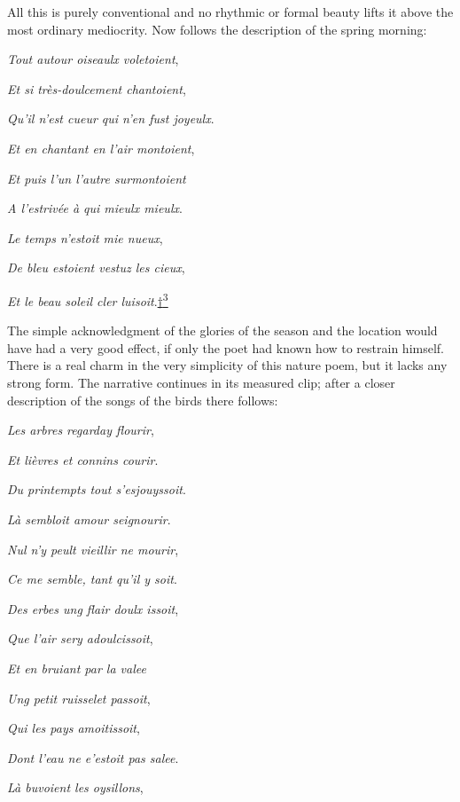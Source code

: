 All this is purely conventional and no rhythmic or formal beauty lifts
it above the most ordinary mediocrity. Now follows the description of
the spring morning:

\emph{Tout autour oiseaulx voletoient},

\emph{Et si très-doulcement chantoient},

\emph{Qu'il n'est cueur qui n'en fust joyeulx}.

\emph{Et en chantant en l'air montoient},

\emph{Et puis l'un l'autre surmontoient}

\emph{A l'estrivée à qui mieulx mieulx}.

\emph{Le temps n'estoit mie nueux},

\emph{De bleu estoient vestuz les cieux},

\emph{Et le beau soleil cler
luisoit}.\protect\hypertarget{21_Chapter_Thirteen__IMAGE_AND_WORD.xhtmlux5cux23id_2709}{\protect\hyperlink{23_NOTES.xhtmlux5cux23id_2710}{†\textsuperscript{3}}}

\protect\hypertarget{21_Chapter_Thirteen__IMAGE_AND_WORD.xhtmlux5cux23page_340}{}{}The
simple acknowledgment of the glories of the season and the location
would have had a very good effect, if only the poet had known how to
restrain himself. There is a real charm in the very simplicity of this
nature poem, but it lacks any strong form. The narrative continues in
its measured clip; after a closer description of the songs of the birds
there follows:

\emph{Les arbres regarday flourir},

\emph{Et lièvres et connins courir}.

\emph{Du printempts tout s'esjouyssoit}.

\emph{Là sembloit amour seignourir}.

\emph{Nul n'y peult vieillir ne mourir},

\emph{Ce me semble, tant qu'il y soit}.

\emph{Des erbes ung flair doulx issoit},

\emph{Que l'air sery adoulcissoit},

\emph{Et en bruiant par la valee}

\emph{Ung petit ruisselet passoit},

\emph{Qui les pays amoitissoit},

\emph{Dont l'eau ne e'estoit pas salee}.

\emph{Là buvoient les oysillons},

